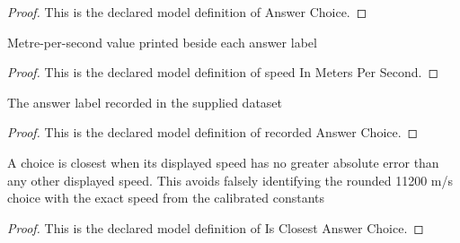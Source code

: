 \begin{proof}
  This is the declared model definition of Answer Choice.
\end{proof}
\begin{definition}
  \label{def:physics:phyx-mini-0714:phyxminiproblems-problemphyxmini0714-answerchoice-speedinmeterspersecond}
  Metre-per-second value printed beside each answer label
\end{definition}
\begin{proof}
  This is the declared model definition of speed In Meters Per Second.
\end{proof}
\begin{definition}
  \label{def:physics:phyx-mini-0714:phyxminiproblems-problemphyxmini0714-recordedanswerchoice}
  The answer label recorded in the supplied dataset
\end{definition}
\begin{proof}
  This is the declared model definition of recorded Answer Choice.
\end{proof}
\begin{definition}
  \label{def:physics:phyx-mini-0714:phyxminiproblems-problemphyxmini0714-isclosestanswerchoice}
  A choice is closest when its displayed speed has no greater absolute error than any other displayed speed. This avoids falsely identifying the rounded 11200 m/s choice with the exact speed from the calibrated constants
\end{definition}
\begin{proof}
  This is the declared model definition of Is Closest Answer Choice.
\end{proof}
